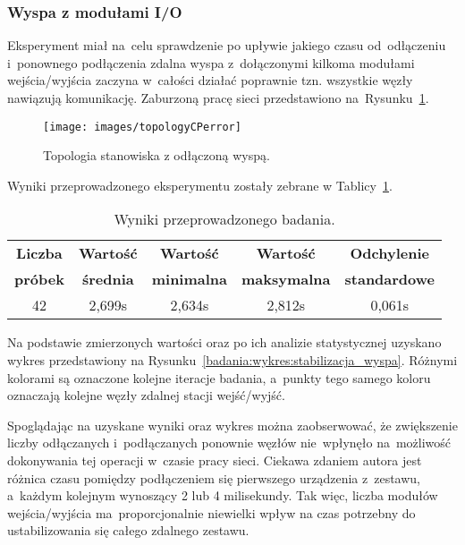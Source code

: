 \subsubsection{Wyspa z modułami I/O}
Eksperyment miał na~celu sprawdzenie po upływie jakiego czasu od~odłączeniu i~ponownego podłączenia zdalna wyspa z~dołączonymi kilkoma modułami wejścia/wyjścia zaczyna w~całości działać poprawnie tzn. wszystkie węzły nawiązują komunikację. Zaburzoną pracę sieci przedstawiono na~Rysunku~\ref{coupler}.
\begin{figure}[!htb] 	\centering 	\texttt{[image: images/topologyCPerror]} \caption{Topologia stanowiska z odłączoną wyspą.} \label{coupler} \end{figure}

Wyniki przeprowadzonego eksperymentu zostały zebrane w Tablicy~\ref{badania:wyniki:stabilizacja_wyspa}.
\begin{table}[!htb]
\begin{center}
\begin{tabular}{| c | c | c | c | c |}\hline
\textbf{Liczba} & \textbf{Wartość} & \textbf{Wartość} & \textbf{Wartość} & \textbf{Odchylenie} \\
\textbf{próbek} & \textbf{średnia} & \textbf{minimalna} & \textbf{maksymalna} & \textbf{standardowe} \\\hline\hline
42 & 2,699s & 2,634s & 2,812s & 0,061s \\\hline
\end{tabular}
\end{center}
\vspace*{-6mm}
  \caption{Wyniki przeprowadzonego badania.}
	\label{badania:wyniki:stabilizacja_wyspa}
\end{table}

Na podstawie zmierzonych wartości oraz po ich analizie statystycznej uzyskano wykres przedstawiony na Rysunku~\ref{badania:wykres:stabilizacja_wyspa}. Różnymi kolorami są oznaczone kolejne iteracje badania, a~punkty tego samego koloru oznaczają kolejne węzły zdalnej stacji wejść/wyjść.


Spoglądając na uzyskane wyniki oraz wykres można zaobserwować, że zwiększenie liczby odłączanych i~podłączanych ponownie węzłów nie~wpłynęło na~możliwość dokonywania tej operacji w~czasie pracy sieci. Ciekawa zdaniem autora jest różnica czasu pomiędzy podłączeniem się pierwszego urządzenia z~zestawu, a~każdym kolejnym wynoszący 2 lub 4 milisekundy. Tak więc, liczba modułów wejścia/wyjścia ma~proporcjonalnie niewielki wpływ na czas potrzebny do ustabilizowania się całego zdalnego zestawu.

